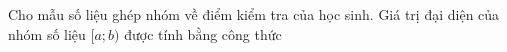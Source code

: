 \begin{ex}
Cho mẫu số liệu ghép nhóm về điểm kiểm tra của học sinh. Giá trị đại diện của nhóm số liệu $[a;b)$ được tính bằng công thức
\loigiai{Giá trị đại diện của nhóm $[a;b)$ là trung điểm $\dfrac{a+b}2$.}
\end{ex}
